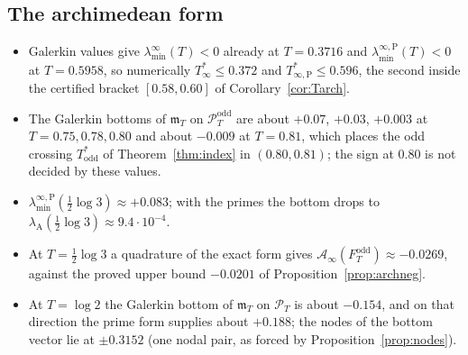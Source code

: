 \documentclass[11pt]{amsart}
\theoremstyle{definition}
\theoremstyle{remark}
\newcommand{\PT}{\mathcal P_T}
\newcommand{\Ainf}{\mathcal A_\infty}
\newcommand{\mT}{\mathfrak m_T}
\newcommand{\laminf}{\lambda^{\infty}_{\min}}
\newcommand{\laminfP}{\lambda^{\infty,\mathrm P}_{\min}}
\begin{document}
\subsection{The archimedean form}
\begin{itemize}
\item Galerkin values give $\laminf(T)<0$ already at $T=0.3716$ and $\laminfP(T)<0$ at $T=0.5958$, so numerically
$T^*_\infty\le0.372$ and $T^*_{\infty,\mathrm P}\le0.596$, the second inside the certified bracket $[0.58,0.60]$ of
Corollary~\ref{cor:Tarch}.
\item The Galerkin bottoms of $\mT$ on $\PT^{\mathrm{odd}}$ are about $+0.07$, $+0.03$, $+0.003$ at $T=0.75,0.78,0.80$ and
about $-0.009$ at $T=0.81$, which places the odd crossing $T^*_{\mathrm{odd}}$ of Theorem~\ref{thm:index} in $(0.80,0.81)$;
the sign at $0.80$ is not decided by these values.
\item $\laminfP(\frac12\log3)\approx+0.083$; with the primes the bottom drops to $\lambda_{\mathrm A}(\frac12\log3)\approx9.4\cdot10^{-4}$.
\item At $T=\frac12\log3$ a quadrature of the exact form gives $\Ainf(F^{\mathrm{odd}}_T)\approx-0.0269$, against the
proved upper bound $-0.0201$ of Proposition~\ref{prop:archneg}.
\item At $T=\log2$ the Galerkin bottom of $\mT$ on $\PT$ is about $-0.154$, and on that direction the prime form
supplies about $+0.188$; the nodes of the bottom vector lie at $\pm0.3152$ (one nodal pair, as forced by
Proposition~\ref{prop:nodes}).
\end{itemize}
\end{document}
